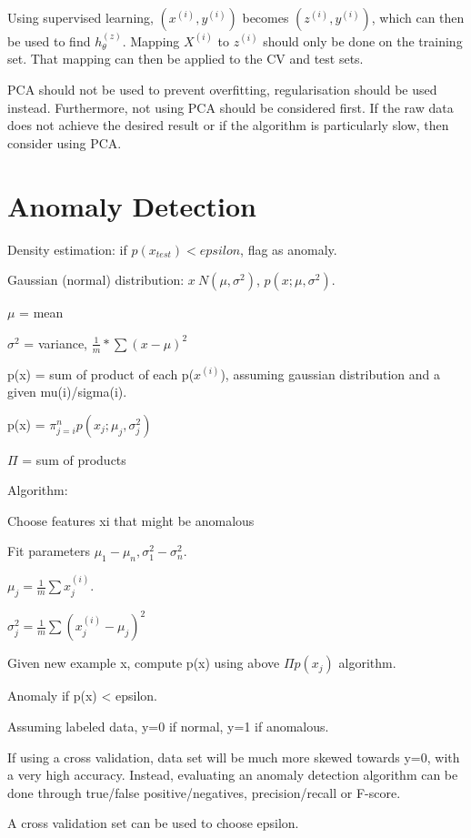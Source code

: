 \documentclass[12pt, a4paper]{article}
\begin{document}
{  Using supervised learning, $(x^{(i)},y^{(i)})$ becomes $(z^{(i)},y^{(i)})$, 
  which can then be used to find $h_\theta^{(z)}$. Mapping $X^{(i)}$ to 
  $z^{(i)}$ should only be done on the training set. That mapping can then be 
  applied to the CV and test sets. 

  PCA should not be used to prevent overfitting, regularisation should be used
  instead. Furthermore, not using PCA should be considered first. If the raw
  data does not achieve the desired result or if the algorithm is particularly
  slow, then consider using PCA. 

  \newpage

\section{Anomaly Detection}

  Density estimation: if $p(x_{test}) < epsilon$, flag as anomaly. 

  Gaussian (normal) distribution: $x~N(\mu,\sigma^2)$, $p(x;\mu,\sigma^2)$.

  $\mu$ = mean
  
  $\sigma^2$ = variance, $\frac{1}{m} * \sum(x - \mu)^2$

  p(x) = sum of product of each p($x^{(i)}$), assuming gaussian distribution and
  a given mu(i)/sigma(i). 

  p(x) = $\pi_{j=i}^n p(x_j;\mu_j, \sigma_j^2)$

  $\Pi$ = sum of products

  Algorithm:

  Choose features xi that might be anomalous

  Fit parameters $\mu_1-\mu_n, \sigma_1^2-\sigma_n^2$. 
  
  $\mu_j = \frac{1}{m} \sum x_j^{(i)}$.
  
  $\sigma^2_j = \frac{1}{m} \sum (x_j^{(i)} - \mu_j)^2$

  Given new example x, compute p(x) using above $\Pi p(x_j)$ algorithm.

  Anomaly if p(x) < epsilon. 

  Assuming labeled data, y=0 if normal, y=1 if anomalous.

  If using a cross validation, data set will be much more skewed towards
  y=0, with a very high accuracy. Instead, evaluating an anomaly detection
  algorithm can be done through true/false positive/negatives, 
  precision/recall or F-score. 
  
  A cross validation set can be used to choose epsilon.  

}
\end{document}
